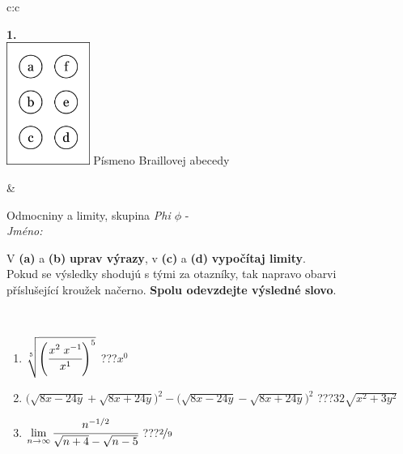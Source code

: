 \documentclass[10pt]{report}
\begin{document}
\begin{tabular}{c:c}
\begin{minipage}[c][104.5mm][t]{0.5\linewidth}
\begin{center}
\begin{minipage}{0.20\linewidth}
\begin{center}
{\Huge\bfseries 1.} \\[2mm]
\includegraphics[height=40mm]{../images/braille.png}
{\small Písmeno Braillovej abecedy}
\end{center}
\end{minipage}
\end{center}
\end{minipage}
&
\begin{minipage}[c][104.5mm][t]{0.5\linewidth}
\begin{center}
\vspace{7mm}
{\huge Odmocniny a limity, skupina \textit{Phi $\phi$} -}\\[5mm]
\textit{Jméno:}\phantom{xxxxxxxxxxxxxxxxxxxxxxxxxxxxxxxxxxxxxxxxxxxxxxxxxxxxxxxxxxxxxxxxx}\\[5mm]
\begin{minipage}{0.95\linewidth}
\begin{center}
V \textbf{(a)} a \textbf{(b)} \textbf{uprav výrazy}, v \textbf{(c)} a \textbf{(d)} \textbf{vypočítaj limity}.\\Pokud se výsledky shodujú s tými za otazníky, tak napravo obarvi\\příslušející kroužek načerno. \textbf{Spolu odevzdejte výsledné slovo}.
\end{center}
\end{minipage}
\\[1mm]
\begin{minipage}{0.79\linewidth}
\begin{center}
\begin{varwidth}{\linewidth}
\begin{enumerate}
\small
\item $\sqrt[5]{\left(\cfrac{x^{2}\;x^{-1}}{x^{1}}\right)^{5}}$\quad \dotfill\; ???\;\dotfill \quad $x^{0}$
\item {\footnotesize{\scriptsize$\big(\sqrt{8x-24y}+\sqrt{8x+24y}\big)^2-\big(\sqrt{8x-24y}-\sqrt{8x+24y}\big)^2$}\quad \dotfill\; ???\;\dotfill \quad $32\sqrt{x^2+3y^2}$}
\item $\lim\limits_{n\to\infty}\cfrac{n^{-1/2}}{\sqrt{n+4}-\sqrt{n-5}}$\quad \dotfill\; ???\;\dotfill \quad $\nicefrac{2}{9}$

\end{enumerate}
\end{varwidth}
\end{center}
\end{minipage}
\end{center}
\end{minipage}
\end{tabular}
\end{document}
